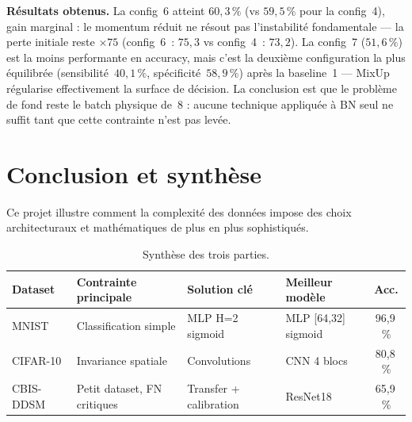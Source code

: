 \documentclass[a4paper,11pt]{article}
\begin{document}
\noindent\textbf{Résultats obtenus.}
La config~6 atteint $60{,}3\,\%$ (vs $59{,}5\,\%$ pour la config~4), gain marginal :
le momentum réduit ne résout pas l'instabilité fondamentale — la perte initiale
reste $\times 75$ (config~6~: $75{,}3$ vs config~4~: $73{,}2$).
La config~7 ($51{,}6\,\%$) est la moins performante en accuracy, mais c'est la deuxième
configuration la plus équilibrée (sensibilité~$40{,}1\,\%$, spécificité~$58{,}9\,\%$)
après la baseline~1 — MixUp régularise effectivement la surface de décision.
La conclusion est que le problème de fond reste le batch physique de~8 : aucune
technique appliquée à BN seul ne suffit tant que cette contrainte n'est pas levée.

\section{Conclusion et synthèse}

Ce projet illustre comment la complexité des données impose des choix architecturaux
et mathématiques de plus en plus sophistiqués.

\begin{table}[H]
\centering
\caption{Synthèse des trois parties.}
\small
\begin{tabular}{lp{3.2cm}p{3.2cm}p{3cm}c}
\toprule
\textbf{Dataset} & \textbf{Contrainte principale} & \textbf{Solution clé} & \textbf{Meilleur modèle} & \textbf{Acc.} \\
\midrule
MNIST     & Classification simple & MLP H=2 sigmoid & MLP [64,32] sigmoid & 96{,}9\,\% \\
CIFAR-10  & Invariance spatiale   & Convolutions    & CNN 4 blocs         & 80{,}8\,\% \\
CBIS-DDSM & Petit dataset, FN critiques & Transfer + calibration & ResNet18 & 65{,}9\,\% \\
\bottomrule
\end{tabular}
\end{table}
\end{document}
